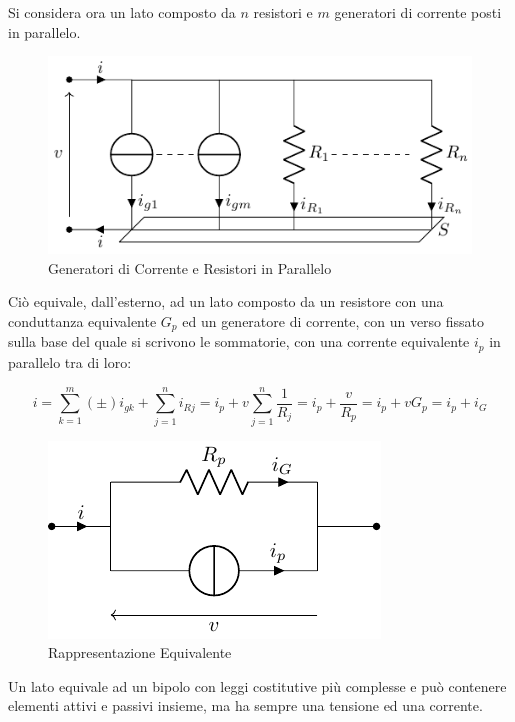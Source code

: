 \documentclass{article}
\numberwithin{equation}{subsection}
\begin{document}
Si considera ora un lato composto da $n$ resistori e $m$ generatori di corrente posti in parallelo. 

\begin{figure}[H]%
    \centering
    \includegraphics{generatore-corrente-resistori-parallelo.pdf}%
    \caption{Generatori di Corrente e Resistori in Parallelo}
    \label{fig:generatore-corrente-resistori-parallelo}
\end{figure}

Ciò equivale, dall'esterno, ad un lato composto da un resistore con una conduttanza equivalente $G_p$ ed un generatore di corrente, con un verso fissato sulla base del quale si 
scrivono le sommatorie, con una corrente equivalente $i_{p}$ in parallelo tra di loro:

\begin{equation*}
    i=\displaystyle\sum_{k=1}^m(\pm)i_{gk}+\sum_{j=1}^ni_{Rj}=i_{p}+v\sum_{j=1}^n\frac{1}{R_j}=i_{p}+\frac{v}{R_p}=i_{p}+vG_p=i_{p}+i_G
\end{equation*}

\begin{figure}[H]%
    \centering
    \includegraphics{generatore-corrente-resistori-parallelo-equivalente.pdf}%
    \caption{Rappresentazione Equivalente}
    \label{fig:generatore-corrente-resistori-parallelo-equivalente}
\end{figure}


Un lato equivale ad un bipolo con leggi costitutive più complesse e può contenere elementi attivi e passivi insieme, ma ha sempre una tensione ed una corrente. 
\end{document}
